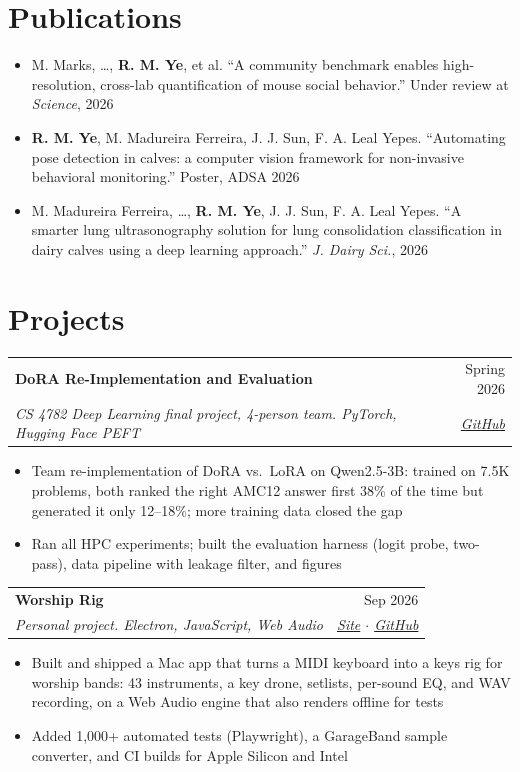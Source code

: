 \documentclass[10pt,letterpaper]{article}
\makeatletter
\newcommand{\entry}[4]{%
  \noindent\begin{tabular*}{\textwidth}{@{}l@{\extracolsep{\fill}}r@{}}
    \textbf{#1} & #2 \\
    \textit{#3} & \textit{#4} \\
  \end{tabular*}\vspace{-1pt}}
\makeatother
\begin{document}
\section{Publications}
\begin{itemize}
  \item M. Marks, \ldots, \textbf{R. M. Ye}, et al. ``A community benchmark enables high-resolution, cross-lab quantification of mouse social behavior.'' Under review at \textit{Science}, 2026
  \item \textbf{R. M. Ye}, M. Madureira Ferreira, J. J. Sun, F. A. Leal Yepes. ``Automating pose detection in calves: a computer vision framework for non-invasive behavioral monitoring.'' Poster, ADSA 2026
  \item M. Madureira Ferreira, \ldots, \textbf{R. M. Ye}, J. J. Sun, F. A. Leal Yepes. ``A smarter lung ultrasonography solution for lung consolidation classification in dairy calves using a deep learning approach.'' \textit{J. Dairy Sci.}, 2026
\end{itemize}

\section{Projects}
\entry{DoRA Re-Implementation and Evaluation}{Spring 2026}{CS 4782 Deep Learning final project, 4-person team. PyTorch, Hugging Face PEFT}{\href{https://github.com/leonjiao5/cs4782-project}{GitHub}}
\begin{itemize}
  \item Team re-implementation of DoRA vs.\ LoRA on Qwen2.5-3B: trained on 7.5K problems, both ranked the right AMC12 answer first 38\% of the time but generated it only 12--18\%; more training data closed the gap
  \item Ran all HPC experiments; built the evaluation harness (logit probe, two-pass), data pipeline with leakage filter, and figures
\end{itemize}

\entry{Worship Rig}{Sep 2026}{Personal project. Electron, JavaScript, Web Audio}{\href{https://ryanmye.github.io/worship-rig/}{Site} $\cdot$ \href{https://github.com/ryanmye/worship-rig}{GitHub}}
\begin{itemize}
  \item Built and shipped a Mac app that turns a MIDI keyboard into a keys rig for worship bands: 43 instruments, a key drone, setlists, per-sound EQ, and WAV recording, on a Web Audio engine that also renders of{}f{}line for tests
  \item Added 1,000+ automated tests (Playwright), a GarageBand sample converter, and CI builds for Apple Silicon and Intel
\end{itemize}
\end{document}
